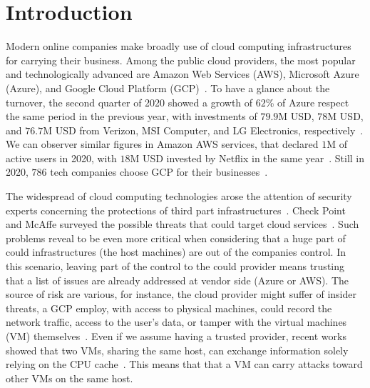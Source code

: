\chapter{Introduction} %
\label{chp:introduction} 


Modern online companies make broadly use of cloud computing infrastructures for 
carrying their business.
Among the public cloud providers, the most popular and technologically advanced 
are Amazon Web Services (AWS), Microsoft Azure (Azure), and Google Cloud 
Platform (GCP)~\citep{flexera_report}.
To have a glance about the turnover, the second quarter of 2020 showed a growth 
of $62$\% of Azure respect the same period in the 
previous year, with investments of $79.9$M USD, $78$M 
USD, and $76.7$M USD from Verizon, MSI Computer, and LG Electronics, 
respectively~\citep{azure_business}.
We can observer similar figures in Amazon AWS services, that declared $1$M of 
active users in 2020, with $18$M USD invested by Netflix in the same 
year~\citep{aws_business}.
Still in 2020, $786$ tech companies choose GCP for their 
businesses~\citep{google_business}.

The widespread of cloud computing technologies arose the attention of security
experts concerning the protections of third part 
infrastructures~\citep{ryan2011cloud,sun2014data}.
Check Point and McAffe surveyed the possible threats that could target
cloud services~\citep{checkpoint_cloud,mcaffee_cloud}.
Such problems reveal to be even more critical when considering that a huge part 
of could infrastructures (\ie the host machines) are out of the companies 
control.
In this scenario, leaving part of the control to the could provider means 
trusting that a list of issues are already addressed at vendor side (\eg Azure 
or AWS).
The source of risk are various, for instance, the cloud provider might suffer 
of insider threats, \eg a GCP employ, with access to physical machines, could 
record the network traffic, access to the user's data, or tamper with the 
virtual machines (VM) themselves~\citep{insider_threat}.
Even if we assume having a trusted provider, recent works showed that two VMs, 
sharing the same host, can exchange information solely relying on the CPU 
cache~\citep{maurice2017hello}. This means that that a VM can carry attacks 
toward other VMs on the same host.

